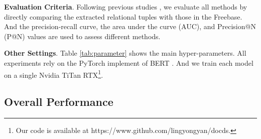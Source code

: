 \documentclass[11pt,a4paper]{article}
\begin{document}
  \textbf{Evaluation Criteria}.
  Following previous studies \cite{lin_neural_2016,deng_leveraging_2019}, we evaluate all methods by directly comparing the extracted relational tuples with those in the Freebase.
  And the precision-recall curve, the area under the curve (AUC), and Precision@N (P@N) values are used to assess different methods.
  
  \textbf{Other Settings}.
  Table \ref{tab:parameter} shows the main hyper-parameters.
  All experiments rely on the PyTorch implement of BERT \cite{wolf_huggingfaces_2019}.
  And we train each model on a single Nvidia TiTan RTX\footnote{Our code is available at https://www.github.com/lingyongyan/docds.}.
  
  \subsection{Overall Performance}
  
\end{document}
